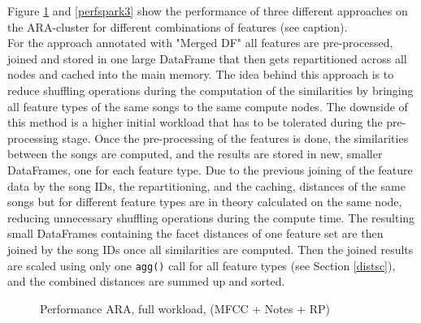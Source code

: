 \noindent Figure \ref {perfspark2} and \ref{perfspark3} show the performance of three different approaches on the ARA-cluster for different combinations of features (see caption).\\
\noindent For the approach annotated with "Merged DF" all features are pre-processed, joined and stored in one large DataFrame that then gets repartitioned across all nodes and cached into the main memory. The idea behind this approach is to reduce shuffling operations during the computation of the similarities by bringing all feature types of the same songs to the same compute nodes. The downside of this method is a higher initial workload that has to be tolerated during the pre-processing stage. 
\noindent Once the pre-processing of the features is done, the similarities between the songs are computed, and the results are stored in new, smaller DataFrames, one for each feature type. Due to the previous joining of the feature data by the song IDs, the repartitioning, and the caching, distances of the same songs but for different feature types are in theory calculated on the same node, reducing unnecessary shuffling operations during the compute time. The resulting small DataFrames containing the facet distances of one feature set are then joined by the song IDs once all similarities are computed. Then the joined results are scaled using only one \lstinline{agg()} call for all feature types (see Section \ref{distsc}), and the combined distances are summed up and sorted.


\FloatBarrier
\begin{figure}[htbp]
	\centering
	\caption{Performance ARA, full workload, (MFCC + Notes + RP)}
	\label{perfspark2}
\end{figure}
\FloatBarrier

